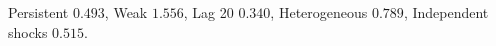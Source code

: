 Persistent $0.493$, Weak $1.556$, Lag 20 $0.340$, Heterogeneous $0.789$, Independent shocks $0.515$.
